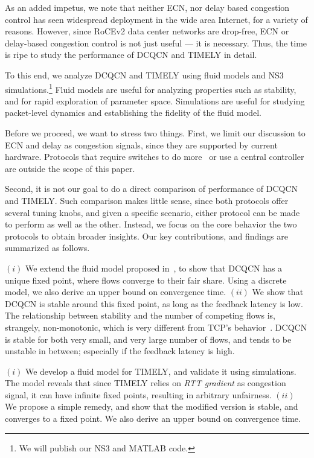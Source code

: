 As an added impetus, we note that neither ECN, nor delay based congestion
control has seen widespread deployment in the wide area Internet, for a variety
of reasons.  However, since RoCEv2 data center networks are drop-free, ECN or
delay-based congestion control is not just useful --- it is necessary. Thus, the
time is ripe to study the performance of DCQCN and TIMELY in detail.


To this end, we analyze DCQCN and TIMELY using fluid models and NS3~\cite{NS3}
simulations.\footnote{We will publish our NS3 and MATLAB code.} Fluid models are
useful for analyzing properties such as stability, and for rapid exploration of
parameter space.  Simulations are useful for studying packet-level dynamics and
establishing the fidelity of the fluid model. 


Before we proceed, we want to stress two things.  First, we limit our discussion
to ECN and delay as congestion signals, since they are supported by current
hardware. Protocols that require switches to do
more~\cite{katabi2002congestion,rcp,pfabric} or use a central
controller~\cite{deadline,perry2014fastpass} are outside the scope of this
paper.

Second, it is not our goal to do a direct comparison of performance of DCQCN and
TIMELY.  Such comparison makes little sense, since both protocols offer several
tuning knobs, and given a specific scenario, either protocol can be made to
perform as well as the other. Instead, we focus on the core behavior the two
protocols to obtain broader insights.  Our key contributions, and findings are
summarized as follows.

 $(i)$ We extend the fluid model proposed in~\cite{dcqcn}, to show
that DCQCN has a unique fixed point, where flows converge to their fair share.
Using a discrete model, we also derive an upper  bound on convergence time.
$(ii)$ We show that DCQCN is stable around this fixed point, as long as the
feedback latency is low. The relationship between stability and the number of
competing flows is, strangely, non-monotonic, which is very different from TCP's
behavior~\cite{misra:TAC2002}. DCQCN is stable for both very small, and very
large number of flows, and tends to be unstable in between; especially if the
feedback latency is high.

 $(i)$ We develop a fluid model for TIMELY, and validate it using
simulations. The model reveals that since TIMELY relies on {\em RTT
gradient} as congestion signal, it can have infinite fixed points, resulting in
arbitrary unfairness.  $(ii)$ We propose a simple remedy,
and show that the modified version is stable, and converges to a fixed point. We
also derive an upper bound on convergence time.

